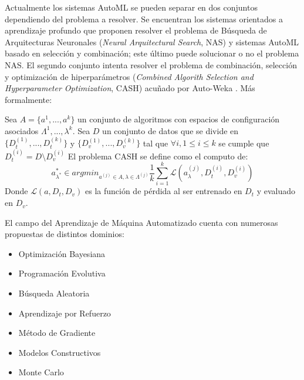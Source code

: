Actualmente los sistemas AutoML se pueden separar en dos conjuntos dependiendo del problema a resolver. Se encuentran los sistemas orientados a aprendizaje profundo que proponen resolver el problema de B\'usqueda de Arquitecturas Neuronales (\textit{Neural Arquitectural Search}, NAS) y  sistemas AutoML basado en selecci\'on y combinaci\'on; este \'ultimo puede solucionar o no el problema NAS. El segundo conjunto intenta resolver el problema de combinaci\'on, selecci\'on y optimizaci\'on de hiperpar\'ametros (\textit{Combined Algorith Selection and Hyperparameter Optimization}, CASH) acuñado por Auto-Weka . M\'as formalmente:
\begin{definition}
    Sea $A = \{a^1, ..., a^k\}$  un conjunto de algoritmos con espacios de configuraci\'on asociados $\Lambda^1, ..., \lambda^k$.
    Sea $D$ un conjunto de datos  que se divide en $\{D_{t}^{(1)},..., D_{t}^{(k)}\}$ y $\{D_{v}^{(1)},..., D_{v}^{(k)}\}$ 
    tal que $\forall i, 1 \leq i \leq k$ se cumple que $D_{t}^{(i)} = D \setminus D^{(i)}_{v}$
    El problema CASH se define como el computo de:
    \begin{equation*}
        a^*_{\lambda^*} \in argmin_{a^{(j)} \in A, \lambda \in \Lambda^{(j)}} \frac{1}{k} \sum^{k}_{i = 1}\mathcal{L}(a^(j)_\lambda, D^{(i)}_t, D^{(i)}_v)
    \end{equation*}
    Donde $\mathcal{L}(a, D_t, D_v)$ es la funci\'on de p\'erdida al ser entrenado en $D_t$ y evaluado en $D_v$.
\end{definition}



El campo del Aprendizaje de M\'aquina Automatizado cuenta con numerosas propuestas de distintos dominios: 
\begin{itemize}
    \item Optimizaci\'on Bayesiana%
    \item Programaci\'on Evolutiva%
    \item B\'usqueda Aleatoria 
    \item Aprendizaje por Refuerzo
    \item M\'etodo de Gradiente
    \item Modelos Constructivos
    \item Monte Carlo
\end{itemize}

